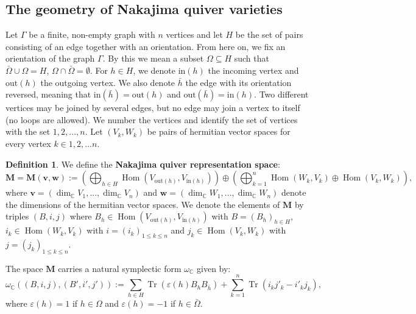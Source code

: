 \documentclass[12pt,oneside,reqno]{amsart}
\theoremstyle{definition}
\newtheorem{definition}[theorem]{Definition}
\numberwithin{equation}{section}
\numberwithin{theorem}{section}
\newcommand{\C}{\mathbb{C}}
\renewcommand{\subset}{\subseteq}
\newcommand{\eps}{\varepsilon}
\newcommand{\Tr}{\operatorname{Tr}}
\newcommand{\Hom}{\operatorname{Hom}}
\newcommand{\hb}{\bar{h}}
\renewcommand{\dim}{\operatorname{dim}}
\begin{document}
\subsection{The geometry of Nakajima quiver varieties}

Let $\Gamma$ be a finite, non-empty graph with $n$ vertices and let $H$ be the set of pairs consisting of an edge together with an orientation. From here on, we fix an orientation of the graph $\Gamma$. By this we mean a subset $\Omega \subset H $ such that $\bar \Omega \cup \Omega =H$,  $\Omega\cap\bar\Omega=\emptyset$. For $h \in H$, we denote $\text{in}(h)$ the incoming vertex and $\text{out}(h)$ the outgoing vertex. We also denote $\hb$ the edge with its orientation reversed, meaning that $\text{in}(\hb)=\text{out}(h)$ and $\text{out}(\hb)=\text{in}(h)$. Two different vertices may be joined by several edges, but no edge may join a vertex to itself (no loops are allowed). We number the vertices and identify the set of vertices with the set ${1,2,...,n}$. Let $(V_k, W_k)$ be pairs of hermitian vector spaces for every vertex $k \in {1,2,...n}$. 

%
\begin{definition}

We define the \textbf{Nakajima quiver representation space}:
%
\begin{equation}\label{NQRS}
   \mathbf M=\mathbf M(\mathbf{v},\mathbf{w}):=\left(\bigoplus_{h\in H} \Hom(V_{\text{out}(h)},V_{\text{in}(h)})\right)\oplus\left(\bigoplus_{k=1}^n \Hom(W_k,V_k)\oplus \Hom(V_k,W_k)\right),
\end{equation}
%
where $ \mathbf{v}= (\dim_\C V_1,...,\dim_\C V_n)$ and $\mathbf{w}=(\dim_\C W_1,...,\dim_\C W_n)$ denote the dimensions of the hermitian vector spaces.
We denote the elements of $\mathbf M$ by triples $(B,i,j)$ where $B_h \in \Hom(V_{\text{out}(h)},V_{\text{in}(h)})$ with $B=(B_h)_{h \in H}$, $i_k \in \Hom(W_k,V_k)$ with $i=(i_k)_{1\le k\le n}$ and $j_k \in \Hom(V_k,W_k)$ with $j=(j_k)_{1\le k\le n}$. 
\end{definition}
%
The space $\mathbf{M}$ carries a natural symplectic form $\omega_\C$ given by:
%
\begin{equation}\label{CSF}
    \omega_\C((B,i,j),(B',i',j')):=\sum\limits_{h \in H} \Tr (\eps(h)B_h B_{\hb})+\sum\limits_{k=1}^n \Tr(i_k j'_k-i'_kj_k),
\end{equation}
%
where $\eps(h)=1$ if $h \in \Omega$ and $\eps(h)=-1$ if $h \in \bar \Omega$.
\end{document}
